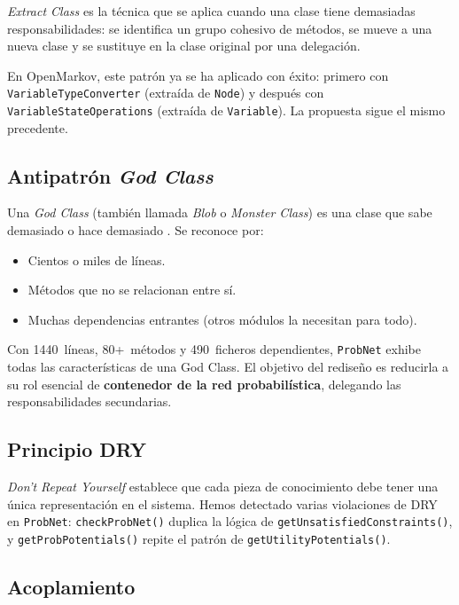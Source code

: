\documentclass[11pt,a4paper]{article}
\newcommand{\code}[1]{\texttt{#1}}
\begin{document}
\emph{Extract Class} \cite{fowler2019} es la t\'ecnica que se aplica
cuando una clase tiene demasiadas responsabilidades: se identifica un
grupo cohesivo de m\'etodos, se mueve a una nueva clase y se sustituye
en la clase original por una delegaci\'on.

En OpenMarkov, este patr\'on ya se ha aplicado con \'exito: primero con
\code{VariableTypeConverter} (extra\'ida de \code{Node}) y despu\'es con
\code{VariableStateOperations} (extra\'ida de \code{Variable}).  La
propuesta sigue el mismo precedente.

\subsection{Antipatr\'on \emph{God Class}}

Una \emph{God Class} (tambi\'en llamada \emph{Blob} o \emph{Monster
Class}) es una clase que sabe demasiado o hace demasiado
\cite{fowler2019}.  Se reconoce por:

\begin{itemize}[nosep]
  \item Cientos o miles de l\'ineas.
  \item M\'etodos que no se relacionan entre s\'i.
  \item Muchas dependencias entrantes (otros m\'odulos la necesitan para
        todo).
\end{itemize}

Con 1440~l\'ineas, 80+~m\'etodos y 490~ficheros dependientes,
\code{ProbNet} exhibe todas las caracter\'isticas de una God Class.
El objetivo del redise\~no es reducirla a su rol esencial de
\textbf{contenedor de la red probabil\'istica}, delegando las
responsabilidades secundarias.

\subsection{Principio DRY}

\emph{Don't Repeat Yourself} \cite{hunt1999} establece que cada pieza de
conocimiento debe tener una \'unica representaci\'on en el sistema.
Hemos detectado varias violaciones de DRY en \code{ProbNet}:
\code{checkProbNet()} duplica la l\'ogica de
\code{getUnsatisfiedConstraints()}, y \code{getProbPotentials()} repite
el patr\'on de \code{getUtilityPotentials()}.

\subsection{Acoplamiento}
\end{document}
